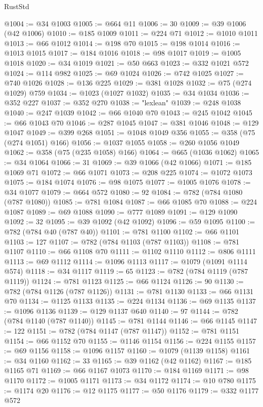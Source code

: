 \begin{lexlean}{RustStd}
\begin{coremodule}
@1004 := @34 @1003
@1005 := @664 @11
@1006 := 30
@1009 := @39 @1006 (@42 @1006)
@1010 := @185 @1009
@1011 := @224 @71
@1012 := @1010 @1011
@1013 := @66 @1012
@1014 := @198 @70
@1015 := @198 @1014
@1016 := @1013 @1015
@1017 := @184 @1016
@1018 := @98 @1017
@1019 := @1005 @1018
@1020 := @34 @1019
@1021 := @50 @663
@1023 := @332 @1021 @572
@1024 := @114 @982
@1025 := @69 @1024
@1026 := @742 @1025
@1027 := @740 @1026
@1028 := @136 @225
@1029 := @381 @1028
@1032 := @75 (@274 @1029) @759
@1034 := @1023 (@1027 @1032)
@1035 := @34 @1034
@1036 := @352 @227
@1037 := @352 @270
@1038 := "lexlean"
@1039 := @248 @1038
@1040 := @247 @1039
@1042 := @66 @1040 @70
@1043 := @245 @1042
@1045 := @66 @1043 @70
@1046 := @287 @1045
@1047 := @381 @1046
@1048 := @129 @1047
@1049 := @399 @268
@1051 := @1048 @1049 @356
@1055 := @358 (@75 (@274 @1051) @166)
@1056 := @1037 @1055
@1058 := @260 @1056 @1049
@1062 := @358 (@75 (@235 @1058) @166)
@1064 := @665 (@1036 @1062)
@1065 := @34 @1064
@1066 := 31
@1069 := @39 @1066 (@42 @1066)
@1071 := @185 @1069 @71
@1072 := @66 @1071
@1073 := @208 @225
@1074 := @1072 @1073
@1075 := @184 @1074
@1076 := @98 @1075
@1077 := @1005 @1076
@1078 := @34 @1077
@1079 := @664 @572
@1080 := 92
@1084 := @782 (@784 @1080 (@787 @1080))
@1085 := @781 @1084
@1087 := @66 @1085 @70
@1088 := @224 @1087
@1089 := @69 @1088
@1090 := @777 @1089
@1091 := @129 @1090
@1092 := 32
@1095 := @39 @1092 (@42 @1092)
@1096 := @59 @1095
@1100 := @782 (@784 @40 (@787 @40))
@1101 := @781 @1100
@1102 := @66 @1101
@1103 := 127
@1107 := @782 (@784 @1103 (@787 @1103))
@1108 := @781 @1107
@1110 := @66 @1108 @70
@1111 := @1102 @1110
@1112 := @806 @1111
@1113 := @69 @1112
@1114 := @1096 @1113
@1117 := @1079 (@1091 @1114 @574)
@1118 := @34 @1117
@1119 := 65
@1123 := @782 (@784 @1119 (@787 @1119))
@1124 := @781 @1123
@1125 := @66 @1124
@1126 := 90
@1130 := @782 (@784 @1126 (@787 @1126))
@1131 := @781 @1130
@1133 := @66 @1131 @70
@1134 := @1125 @1133
@1135 := @224 @1134
@1136 := @69 @1135
@1137 := @1096 @1136
@1139 := @129 @1137 @640
@1140 := 97
@1144 := @782 (@784 @1140 (@787 @1140))
@1145 := @781 @1144
@1146 := @66 @1145
@1147 := 122
@1151 := @782 (@784 @1147 (@787 @1147))
@1152 := @781 @1151
@1154 := @66 @1152 @70
@1155 := @1146 @1154
@1156 := @224 @1155
@1157 := @69 @1156
@1158 := @1096 @1157
@1160 := @1079 (@1139 @1158)
@1161 := @34 @1160
@1162 := 33
@1165 := @39 @1162 (@42 @1162)
@1167 := @185 @1165 @71
@1169 := @66 @1167 @1073
@1170 := @184 @1169
@1171 := @98 @1170
@1172 := @1005 @1171
@1173 := @34 @1172
@1174 := @10 @780
@1175 := @1174 @20
@1176 := @12 @1175
@1177 := @50 @1176
@1179 := @332 @1177 @572

\end{coremodule}
\end{lexlean}
